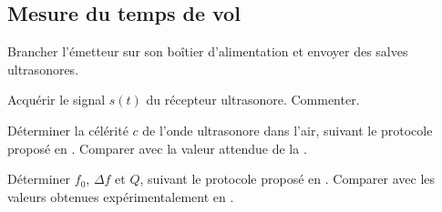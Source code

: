  \subsection{Mesure du temps de vol}
 Brancher l'émetteur sur son boîtier d'alimentation et envoyer des salves ultrasonores.
 \begin{protocole}
 \item Acquérir le signal $s(t)$ du récepteur ultrasonore. Commenter.
\item Déterminer la célérité $c$ de l'onde ultrasonore dans l'air, suivant le protocole proposé en . Comparer avec la valeur attendue de la .
\item Déterminer $f_0$, $\Delta f$ et $Q$, suivant le protocole proposé en . Comparer avec les valeurs obtenues expérimentalement en .
 \end{protocole}


